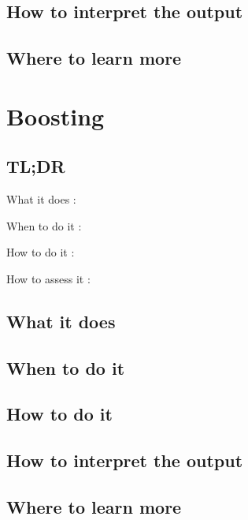 \documentclass[
]{book}
\begin{document}
\hypertarget{how-to-interpret-the-output-17}{%
\section{How to interpret the output}\label{how-to-interpret-the-output-17}}

\hypertarget{where-to-learn-more-17}{%
\section{Where to learn more}\label{where-to-learn-more-17}}

\hypertarget{boosting}{%
\chapter{Boosting}\label{boosting}}

\hypertarget{tldr-18}{%
\section{TL;DR}\label{tldr-18}}

What it does
:

When to do it
:

How to do it
:

How to assess it
:

\hypertarget{what-it-does-18}{%
\section{What it does}\label{what-it-does-18}}

\hypertarget{when-to-do-it-18}{%
\section{When to do it}\label{when-to-do-it-18}}

\hypertarget{how-to-do-it-18}{%
\section{How to do it}\label{how-to-do-it-18}}

\hypertarget{how-to-interpret-the-output-18}{%
\section{How to interpret the output}\label{how-to-interpret-the-output-18}}

\hypertarget{where-to-learn-more-18}{%
\section{Where to learn more}\label{where-to-learn-more-18}}
\end{document}
